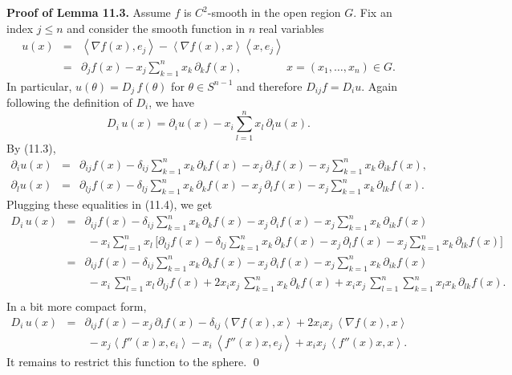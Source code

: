 \documentclass[reqno,12pt]{amsart}
\theoremstyle{plain}
\begin{document}
\vskip5mm
{\bf Proof of Lemma 11.3.} Assume $f$ is $C^2$-smooth in the open region $G$.
Fix an index 
$j \leq n$ and consider the smooth function in $n$ real variables
\begin{eqnarray}
u(x) & = & 
\left<\nabla f(x),e_j\right> - 
\left<\nabla f(x),x\right>\left<x,e_j\right> \nonumber \\
 & = &
\partial_j f(x) - x_j \sum_{k=1}^n x_k\, \partial_k f(x), \qquad \qquad
x = (x_1,\dots,x_n) \in G.
\end{eqnarray}
In particular, $u(\theta) = D_j\, f(\theta)$ for $\theta \in S^{n-1}$ 
and therefore $D_{ij} f = D_i u$. Again following the definition of $D_i$, 
we have
\begin{equation}
D_i\, u(x) = \partial_i u(x) - x_i \sum_{l=1}^n x_l\, \partial_l u(x).
\end{equation}
By (11.3),
\begin{eqnarray*}
\partial_i u(x)
 & = & 
\partial_{ij} f(x) - \delta_{ij} \sum_{k=1}^n x_k\, \partial_k f(x) - 
x_j\, \partial_i f(x) - x_j \sum_{k=1}^n x_k\, \partial_{ik} f(x), \\
\partial_l u(x)
 & = & 
\partial_{lj} f(x) - \delta_{lj} \sum_{k=1}^n x_k\, \partial_k f(x) - 
x_j\, \partial_l f(x) - x_j \sum_{k=1}^n x_k\, \partial_{lk} f(x).
\end{eqnarray*}
Plugging these equalities in (11.4), we get
\begin{eqnarray*}
D_i\, u(x)
 & = &
\partial_{ij} f(x) - \delta_{ij} \sum_{k=1}^n x_k\, \partial_k f(x) - 
x_j\, \partial_i f(x) - x_j \sum_{k=1}^n x_k\, \partial_{ik} f(x) \\
 & & \
 - x_i \sum_{l=1}^n x_l\,
\Big[\partial_{lj} f(x) - \delta_{lj} \sum_{k=1}^n x_k\, \partial_k f(x) - 
x_j\, \partial_l f(x) - x_j \sum_{k=1}^n x_k\, \partial_{lk} f(x)\Big] \\
 & = &
\partial_{ij} f(x) - \delta_{ij} \sum_{k=1}^n x_k\, \partial_k f(x) - 
x_j\, \partial_i f(x) - x_j \sum_{k=1}^n x_k\, \partial_{ik} f(x) \\
 & & \
- x_i\, \sum_{l=1}^n x_l\,\partial_{lj} f(x) 
+ 2 x_i x_j\, \sum_{k=1}^n x_k\, \partial_k f(x)  
+ x_i x_j\, \sum_{l=1}^n \sum_{k=1}^n x_l x_k\, \partial_{lk} f(x). \\
\end{eqnarray*}
In a bit more compact form,
\begin{eqnarray*}
D_i\, u(x)
 & = &
\partial_{ij} f(x) - x_j\, \partial_i f(x) 
- \delta_{ij} \left<\nabla f(x),x\right> 
+ 2 x_i x_j\, \left<\nabla f(x),x\right> \\
 & & \
- x_j \left<f''(x)x,e_i\right> - x_i\, \left<f''(x)x,e_j\right>
+ x_i x_j\, \left<f''(x)x,x\right>.
\end{eqnarray*}
It remains to restrict this function to the sphere.
\qed
\end{document}
